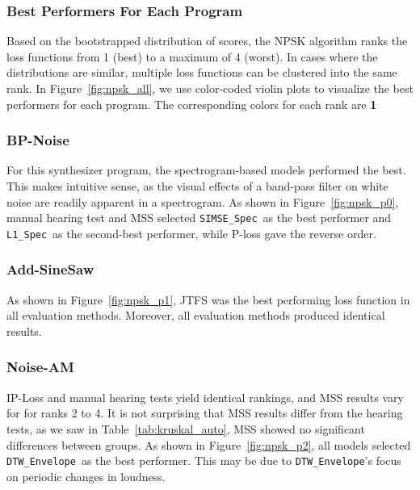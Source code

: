 \documentclass[lettersize,journal]{IEEEtran}
\newcommand{\SIMSESpec}{\texttt{SIMSE\_Spec}}
\newcommand{\LoneSpec}{\texttt{L1\_Spec}}
\newcommand{\DTWEnv}{\texttt{DTW\_Envelope}}
\newcommand{\BPNoise}{\textbf{BP-Noise}}
\newcommand{\AddSineSaw}{\textbf{Add-SineSaw}}
\newcommand{\AmpMod}{\textbf{Noise-AM}}
\begin{document}
\subsubsection{Best Performers For Each Program}
Based on the bootstrapped distribution of scores, the NPSK algorithm ranks the loss functions from 1 (best) to a maximum of 4 (worst). In cases where the distributions are similar, multiple loss functions can be clustered into the same rank. In Figure~\ref{fig:npsk_all}, we use color-coded violin plots to visualize the best performers for each program. The corresponding colors for each rank are
\colorbox{rank1}{\textcolor{black}{\textbf{1}}} \colorbox{rank2}{\textcolor{white}{\textbf{2}}} \colorbox{rank3}{\textcolor{white}{\textbf{3}}} \colorbox{rank4}{\textcolor{black}{\textcolor{white}{\textbf{4}}}}




\subsubsection{\BPNoise}
For this synthesizer program, the spectrogram-based models performed the best. This makes intuitive sense, as the visual effects of a band-pass filter on white noise are readily apparent in a spectrogram. As shown in Figure~\ref{fig:npsk_p0}, manual hearing test and MSS selected \SIMSESpec~as the best performer and \LoneSpec~as the second-best performer, while P-loss gave the reverse order. 


\subsubsection{\AddSineSaw}
As shown in Figure~\ref{fig:npsk_p1}, JTFS was the best performing loss function in all evaluation methods. Moreover, all evaluation methods produced identical results. 

\subsubsection{\AmpMod}
IP-Loss and manual hearing tests yield identical rankings, and MSS results vary for for ranks 2 to 4. It is not surprising that MSS results differ from the hearing tests, as we saw in Table~\ref{tab:kruskal_auto}, MSS showed no significant differences between groups. As shown in Figure~\ref{fig:npsk_p2}, all models selected \DTWEnv~as the best performer. This may be due to \DTWEnv's focus on periodic changes in loudness.
\end{document}
